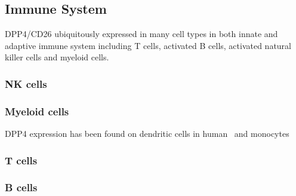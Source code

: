 \subsection{Immune System}
DPP4/CD26 ubiquitously expressed in many cell types in both innate and adaptive immune system including T cells, activated B cells, activated natural killer cells and myeloid cells.~\cite{Abbott1994,Shingu2003,Hong1989,Gutschmidt1981,Dikov2004,Bühling1995,Tanaka1992,Gorrell1991}  

\subsubsection{NK cells}

\subsubsection{Myeloid cells}
DPP4 expression has been found on dendritic cells in human~\cite{Zhong2013,Gliddon2002,Epardaud2004} and monocytes

\subsubsection{T cells}
\subsubsection{B cells}
